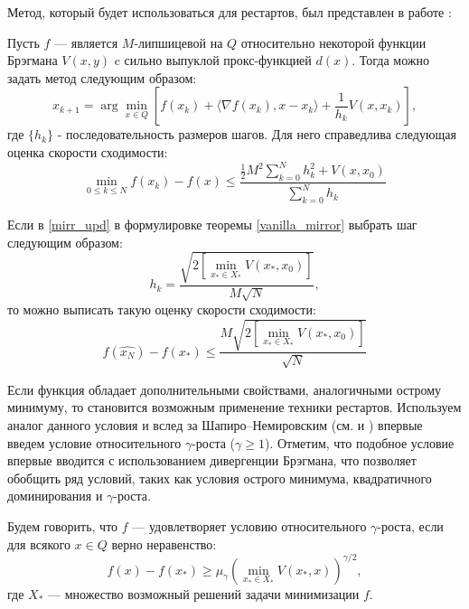 Метод, который будет использоваться для рестартов, был представлен в работе \cite{Lu_2018}:
\begin{theorem} \label{vanilla_mirror}
    Пусть $f$ --- является $M$-липшицевой на $Q$ относительно некоторой функции Брэгмана $V(x, y)$ c сильно выпуклой прокс-функцией $d(x)$. Тогда можно задать метод следующим образом:
    \begin{equation} \label{mirr_upd}
        x_{k+1} = \arg \min_{x \in Q} {\left[ f(x_k) + \langle \nabla f(x_k), x - x_k \rangle + \frac{1}{h_k} V(x, x_k)\right]},
    \end{equation}
    где $\{ h_k \}$ - последовательность размеров шагов.
    Для него справедлива следующая оценка скорости сходимости:
    \begin{equation} \label{general_est}
        \min_{0\leq k \leq N} f(x_k) - f(x) \leq \frac{\frac{1}{2} M^2 \sum_{k=0}^N h_k^2 + V(x, x_0)}{\sum_{k=0}^N h_k}
    \end{equation}
\end{theorem}

\begin{remark}
    Если в \eqref{mirr_upd} в формулировке теоремы \ref{vanilla_mirror} выбрать шаг следующим образом:
    \begin{equation} \label{mirr_step}
        h_{k} = \frac{\sqrt{2 \left[\min\limits_{x_* \in X_*}{V(x_*, x_0)}\right] }}{M\sqrt{N}},
    \end{equation}
    то можно выписать такую оценку скорости сходимости:
    \begin{equation} \label{mirr_est}
        f(\widehat{x_N}) - f(x_*) \leq \frac{M\sqrt{2 \left[\min\limits_{x_* \in X_*}{V(x_*, x_0)}\right]}}{\sqrt{N}}
    \end{equation}
\end{remark}

Если функция обладает дополнительными свойствами, аналогичными острому минимуму,  то становится возможным применение техники рестартов. Используем аналог данного условия и вслед за Шапиро–Немировским (см. \cite{shapiro_2005} и \cite{shapiro_2021} ) впервые введем условие относительного $\gamma$-роста ($\gamma \geq 1$). Отметим, что подобное условие впервые вводится с использованием дивергенции Брэгмана, что позволяет обобщить ряд условий, таких как условия острого минимума, квадратичного доминирования и $\gamma$-роста.
\begin{definition}
   Будем говорить, что $f$ --- удовлетворяет условию относительного $\gamma$-роста, если для всякого $x \in Q$ верно неравенство:
   \begin{equation} \label{gamma-growth}
       f(x) - f(x_*) \geq \mu_{\gamma}\left(\min_{x_* \in X_*}{V(x_*,x)}\right)^{\gamma/2},
   \end{equation}
   где $X_*$ --- множество возможный решений задачи минимизации $f$. 
\end{definition}

